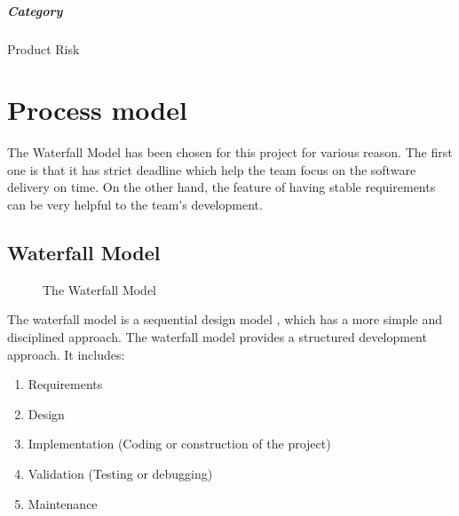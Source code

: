 \documentclass[11pt, a4paper]{report}
\begin{document}
	\paragraph{Category}Product Risk

\chapter{Process model}
The Waterfall Model has been chosen for this project for various reason. The first one is that it has strict deadline which help the team focus on the software delivery on time. On the other hand, the feature of having stable requirements can be very helpful to the team's development. 

\section{Waterfall Model}

\begin{figure}[ht]
\centering
\setlength\fboxsep{2pt}
\setlength\fboxrule{0.2pt}
\caption{The Waterfall Model}
\label{sec:WTF}
\label{fig:WTF}
\end{figure}

The waterfall model is a sequential design model , which has a more simple and disciplined approach. The waterfall model provides a structured development approach. It includes:
\begin{enumerate}
	\item  Requirements
	\item  Design
	\item  Implementation (Coding or construction of the project)
	\item  Validation (Testing or debugging)
	\item  Maintenance
\end{enumerate}
\end{document}
